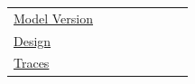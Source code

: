 \documentclass[smallextended]{svjour3}
\newcommand{\must}{\textbf{must}\xspace}
\newcommand{\iconM}{\usebox{\iconMbox}\xspace}
\newcommand{\iconS}{\usebox{\iconSbox}\xspace}
\newcommand{\iconM}{●\xspace}
\newcommand{\iconS}{○\xspace}
\begin{document}
\begin{appendices}
\begin{center}
\begin{tabular}{@{} l c c c c c c c @{}}
\hyperref[sec:report-model-version-configuration-and-customizations]{Model Version}
  & \iconM %
  & \iconM %
  & \iconM %
  & \iconM %
  & \iconM %
  & \iconM %
  & \iconM %
  \\
\hyperref[sec:report-system-and-prompt-design]{Design}
  & \iconM %
  & \iconM %
  & \iconM %
  & \iconM %
  & \iconS %
  & \iconM %
  & \iconM %
  \\
\hyperref[sec:report-session-traces]{Traces}
  & \iconS %

\end{tabular}
\end{center}
\end{appendices}
\end{document}
